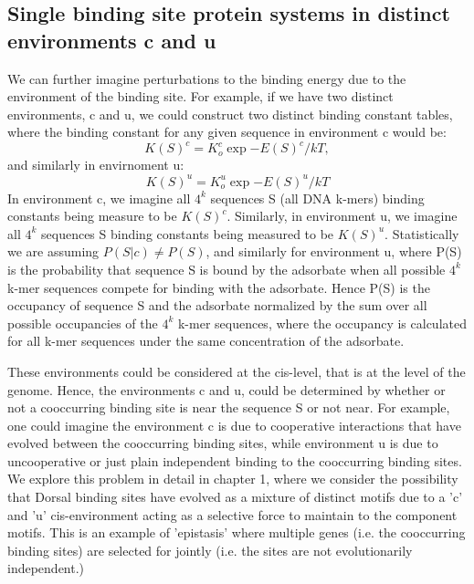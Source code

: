 \subsection{Single binding site protein systems in distinct environments c and u}
We can further imagine perturbations to the binding energy due to the environment of the binding site.  For example, if we have two distinct environments, c and u, we could construct two distinct binding constant tables, where the binding constant for any given sequence in environment c would be:
\begin{equation}\label{}
  K(S)^c =K_o^c\exp{-E(S)^c/kT},
\end{equation}
and similarly in envirnoment u:
\begin{equation}\label{}
  K(S)^u=K_o^u \exp{-E(S)^u/kT}
\end{equation}
In environment c, we imagine all $4^k$ sequences S (all DNA k-mers) binding constants being measure to be $ K(S)^c$.  Similarly, in environment u, we imagine all $4^k$ sequences S binding constants being measured to be $ K(S)^u$.  Statistically we are  assuming $P(S|c)\neq P(S)$, and similarly for environment u, where P(S) is the probability that sequence S is bound by the adsorbate when all possible $4^k$ k-mer sequences compete for binding with the adsorbate.  Hence P(S) is the occupancy of sequence S and the adsorbate normalized by the sum over all possible occupancies of the $4^k$ k-mer sequences, where the occupancy is calculated for all k-mer sequences under the same concentration of the adsorbate.

These environments could be considered at the cis-level, that is at the level of the genome.  Hence, the environments c and u, could be determined by whether or not a cooccurring binding site is near the sequence S or not near.  For example, one could imagine the environment c is due to cooperative interactions that have evolved between the cooccurring binding sites, while environment u is due to uncooperative or just plain independent binding to the cooccurring binding sites.  We explore this problem in detail in chapter 1, where we consider the possibility that Dorsal binding sites have evolved as a mixture of distinct motifs due to a 'c' and 'u' cis-environment acting as a selective force to maintain to the component motifs.  This is an example of 'epistasis' where multiple genes (i.e. the cooccurring binding sites) are selected for jointly (i.e. the sites are not evolutionarily independent.)


